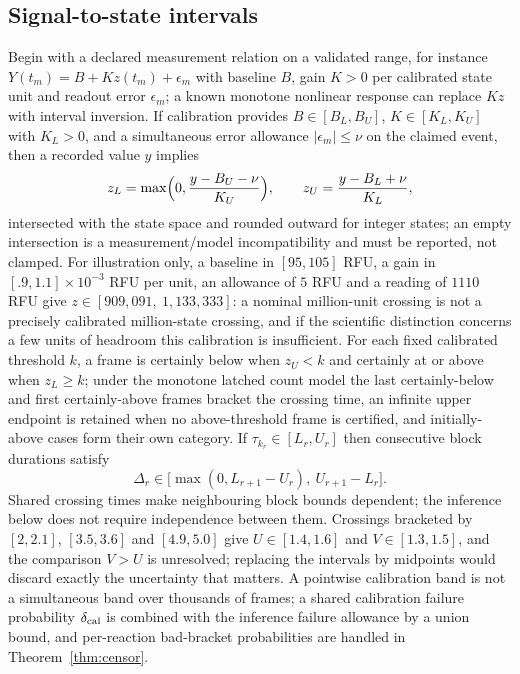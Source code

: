 \documentclass[11pt,a4paper]{article}
\theoremstyle{plain}
\theoremstyle{definition}
\theoremstyle{remark}
\begin{document}
\subsection{Signal-to-state intervals}\label{sec:signal}
Begin with a declared measurement relation on a validated range, for instance $Y(t_m)=B+Kz(t_m)+\epsilon_m$ with baseline $B$, gain $K>0$ per calibrated state unit and readout error $\epsilon_m$; a known monotone nonlinear response can replace $Kz$ with interval inversion. If calibration provides $B\in[B_L,B_U]$, $K\in[K_L,K_U]$ with $K_L>0$, and a simultaneous error allowance $|\epsilon_m|\le\nu$ on the claimed event, then a recorded value $y$ implies
\begin{equation}\label{eq:state}
z_L=\max\Bigl(0,\frac{y-B_U-\nu}{K_U}\Bigr),\qquad z_U=\frac{y-B_L+\nu}{K_L},
\end{equation}
intersected with the state space and rounded outward for integer states; an empty intersection is a measurement/model incompatibility and must be reported, not clamped. For illustration only, a baseline in $[95,105]$ RFU, a gain in $[.9,1.1]\times10^{-3}$ RFU per unit, an allowance of $5$ RFU and a reading of $1110$ RFU give $z\in[909{,}091,\ 1{,}133{,}333]$: a nominal million-unit crossing is not a precisely calibrated million-state crossing, and if the scientific distinction concerns a few units of headroom this calibration is insufficient. For each fixed calibrated threshold $k$, a frame is certainly below when $z_U<k$ and certainly at or above when $z_L\ge k$; under the monotone latched count model the last certainly-below and first certainly-above frames bracket the crossing time, an infinite upper endpoint is retained when no above-threshold frame is certified, and initially-above cases form their own category. If $\tau_{k_r}\in[L_r,U_r]$ then consecutive block durations satisfy
\begin{equation}\label{eq:blockbounds}
\Delta_r\in\bigl[\max(0,L_{r+1}-U_r),\ U_{r+1}-L_r\bigr].
\end{equation}
Shared crossing times make neighbouring block bounds dependent; the inference below does not require independence between them. Crossings bracketed by $[2,2.1]$, $[3.5,3.6]$ and $[4.9,5.0]$ give $U\in[1.4,1.6]$ and $V\in[1.3,1.5]$, and the comparison $V>U$ is unresolved; replacing the intervals by midpoints would discard exactly the uncertainty that matters. A pointwise calibration band is not a simultaneous band over thousands of frames; a shared calibration failure probability $\delta_{\rm cal}$ is combined with the inference failure allowance by a union bound, and per-reaction bad-bracket probabilities are handled in Theorem~\ref{thm:censor}.
\end{document}
